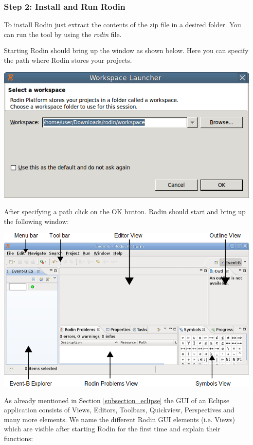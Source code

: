 \subsubsection{Step 2: Install and Run Rodin}

To install Rodin just extract the contents of the zip file in a desired folder. You can run the tool by using the \textit{rodin} file.

Starting Rodin should bring up the window as shown below. Here you can specify the path where Rodin stores your projects.

\begin{center}
	\includegraphics{img/tutorial/install2.png}
\end{center}

After specifying a path click on the \textsf{OK} button. Rodin should start and bring up the following window:

\begin{center}
	\includegraphics{img/tutorial/install3.png}
\end{center}

As already mentioned in Section \ref{subsection_eclipse} the GUI of an Eclipse application consists of Views, Editors, Toolbars, Quickview, Perspectives and many more elements. We name the different Rodin GUI elements (i.e. Views) which are visible after starting Rodin for the first time and explain their functions:

